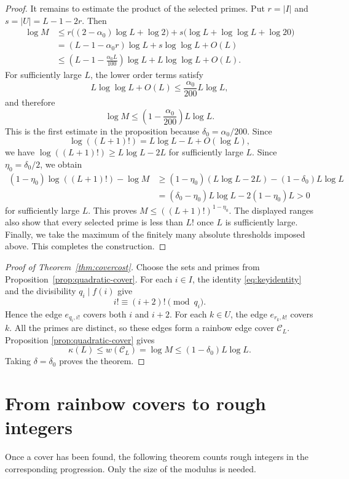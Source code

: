 \documentclass[11pt]{amsart}
\theoremstyle{definition}
\theoremstyle{remark}
\begin{document}
\begin{proof}
It remains to estimate the product of the selected primes.  Put $r=|I|$ and
$s=|U|=L-1-2r$.  Then
\begin{align*}
\log M
&\leq
r\bigl((2-\alpha_0)\log L+\log2\bigr)
+s\bigl(\log L+\log\log L+\log20\bigr)\\
&=(L-1-\alpha_0r)\log L+s\log\log L+O(L)\\
&\leq
\left(L-1-\frac{\alpha_0L}{100}\right)\log L
+L\log\log L+O(L).
\end{align*}
For sufficiently large $L$, the lower order terms satisfy
\[
L\log\log L+O(L)
\leq\frac{\alpha_0}{200}L\log L,
\]
and therefore
\[
\log M
\leq
\left(1-\frac{\alpha_0}{200}\right)L\log L.
\]
This is the first estimate in the proposition because
$\delta_0=\alpha_0/200$.
Since
\[
\log((L+1)!)=L\log L-L+O(\log L),
\]
we have $\log((L+1)!)\geq L\log L-2L$ for sufficiently large $L$.  Since
$\eta_0=\delta_0/2$, we obtain
\begin{align*}
(1-\eta_0)\log((L+1)!)-\log M
&\geq
(1-\eta_0)(L\log L-2L)-(1-\delta_0)L\log L\\
&=(\delta_0-\eta_0)L\log L-2(1-\eta_0)L>0
\end{align*}
for sufficiently large $L$.  This proves
$M\leq((L+1)!)^{1-\eta_0}$.  The displayed ranges also show that every
selected prime is less than $L!$ once $L$ is sufficiently large.  Finally,
we take the maximum of the finitely many absolute thresholds imposed above.
This completes the construction.
\end{proof}

\begin{proof}[Proof of Theorem~\ref{thm:covercost}]
\enlargethispage{\baselineskip}
Choose the sets and primes from Proposition~\ref{prop:quadratic-cover}.  For
each $i\in I$, the identity \eqref{eq:keyidentity} and the divisibility
$q_i\mid f(i)$ give
\[
i!\equiv(i+2)!\pmod{q_i}.
\]
Hence the edge $e_{q_i,i!}$ covers both $i$ and $i+2$.  For each $k\in U$,
the edge $e_{r_k,k!}$ covers $k$.  All the primes are distinct, so these
edges form a rainbow edge cover $\mathcal C_L$.  Proposition
\ref{prop:quadratic-cover} gives
\[
\kappa(L)\leq w(\mathcal C_L)
=\log M\leq(1-\delta_0)L\log L.
\]
Taking $\delta=\delta_0$ proves the theorem.
\end{proof}

\section{From rainbow covers to rough integers}

Once a cover has been found, the following theorem counts rough integers in
the corresponding progression.  Only the size of the modulus is needed.
\end{document}
